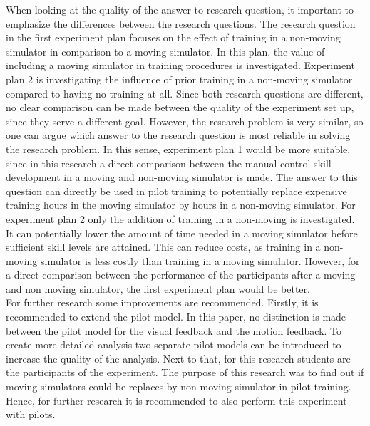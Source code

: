 \documentclass[conference]{IEEEtran}
\begin{document}
When looking at the quality of the answer to research question, it important to emphasize the differences between the research questions. The research question in the first experiment plan focuses on the effect of training in a non-moving simulator in comparison to a moving simulator. In this plan, the value of including a moving simulator in training procedures is investigated. Experiment plan 2 is investigating the influence of prior training in a non-moving simulator compared to having no training at all. Since both research questions are different, no clear comparison can be made between the quality of the experiment set up, since they serve a different goal. However, the research problem is very similar, so one can argue which answer to the research question is most reliable in solving the research problem. In this sense, experiment plan 1 would be more suitable, since in this research a direct comparison between the manual control skill development in a moving and non-moving simulator is made. The answer to this question can directly be used in pilot training to potentially replace expensive training hours in the moving simulator by hours in a non-moving simulator. For experiment plan 2 only the addition of training in a non-moving is investigated. It can potentially lower the amount of time needed in a moving simulator before sufficient skill levels are attained. This can reduce costs, as training in a non-moving simulator is less costly than training in a moving simulator. However, for a direct comparison between the performance of the participants after a moving and non moving simulator, the first experiment plan would be better. \\


For further research some improvements are recommended. Firstly, it is recommended to extend the pilot model. In this paper, no distinction is made between the pilot model for the visual feedback and the motion feedback. To create more detailed analysis two separate pilot models can be introduced to increase the quality of the analysis. Next to that, for this research students are the participants of the experiment. The purpose of this research was to find out if moving simulators could be replaces by non-moving simulator in pilot training. Hence, for further research it is recommended to also perform this experiment with pilots.
\end{document}
